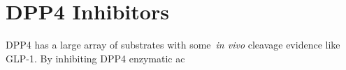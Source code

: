 \section{DPP4 Inhibitors}
DPP4 has a large array of substrates with some~\textit{in vivo} cleavage evidence like GLP-1. By inhibiting DPP4 enzymatic ac